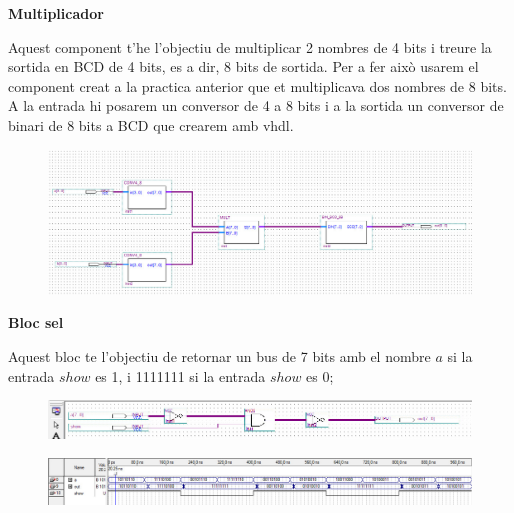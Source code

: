 \documentclass[12pt, a4papre]{article}
\begin{document}
	\textbf{\large{Multiplicador}}
	
	Aquest component t'he l'objectiu de multiplicar 2 nombres de 4 bits i treure la sortida en BCD de 4 bits, es a dir, 8 bits de sortida. Per a fer això usarem el component creat a la practica anterior que et multiplicava dos nombres de 8 bits. A la entrada hi posarem un conversor de 4 a 8 bits i a la sortida un conversor de binari de 8 bits a BCD que crearem amb vhdl.
	
	\begin{figure}[H]
		\begin{center}
		\includegraphics[width=130mm]{Mult_Bin_BCD.jpeg}
		\end{center}
	\end{figure}
	
	\textbf{\large{Bloc sel}}
	
	Aquest bloc te l'objectiu de retornar un bus de 7 bits amb el nombre $a$ si la entrada $show$ es 1, i 1111111 si la entrada $show$ es 0;
	\begin{figure}[H]
		\begin{center}
		\includegraphics[width=130mm]{SEL.jpeg}
		\end{center}
	\end{figure}
	
	\begin{figure}[H]
		\begin{center}
		\includegraphics[width=130mm]{Simulacio_Sel.jpeg}
		\end{center}
	\end{figure}
		
\end{document}
